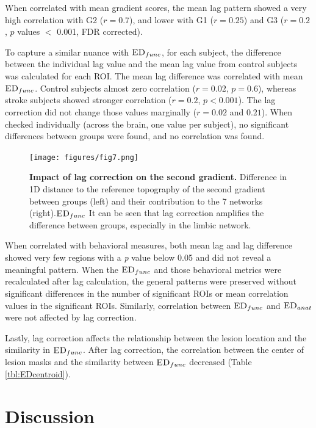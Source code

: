 \documentclass[fleqn,10pt]{wlscirep}
\begin{document}
When correlated with mean gradient scores, the mean lag pattern showed a very high correlation with G2 ($r = 0.7$), and lower with G1 ($r = 0.25$) and G3 ($r = 0.2$, $p$ values $<$ 0.001, FDR corrected).

To capture a similar nuance with $\textsc{ED}_{{func}}$, for each subject, the difference between the individual lag value and the mean lag value from control subjects was calculated for each ROI. The mean lag difference was correlated with mean $\textsc{ED}_{{func}}$. Control subjects almost zero correlation ($r = 0.02$, $ p = 0.6$), whereas stroke subjects showed stronger correlation ($r = 0.2$, $p < 0.001$). The lag correction did not change those values marginally ($r = 0.02$ and $0.21$). 
When checked individually (across the brain, one value per subject), no significant differences between groups were found, and no correlation was found. 

    \begin{figure}[]
\centering
\texttt{[image: figures/fig7.png]}
\caption{\label{fig:secondgra1Dafterlag} \textbf{Impact of lag correction on the second gradient.} Difference in 1D distance to the reference topography of the second gradient between groups (left) and their contribution to the 7 networks (right).$\textsc{ED}_{{func}}$ It can be seen that lag correction amplifies the difference between groups, especially in the limbic network.} 
\end{figure}


When correlated with behavioral measures,  both mean lag and lag difference showed very few regions with a \emph{p} value below 0.05 and did not reveal a meaningful pattern. When the $\textsc{ED}_{{func}}$ and those behavioral metrics were recalculated after lag calculation, the general patterns were preserved without significant differences in the number of significant ROIs or mean correlation values in the significant ROIs. Similarly, correlation between $\textsc{ED}_{{func}}$ and $\textsc{ED}_{{anat}}$ were not affected by lag correction. 

Lastly, lag correction affects the relationship between the lesion location and the similarity in $\textsc{ED}_{{func}}$. After lag correction, the correlation between the center of lesion masks and the similarity between $\textsc{ED}_{{func}}$ decreased (Table \ref{tbl:EDcentroid}). 

\section*{Discussion}
\end{document}
